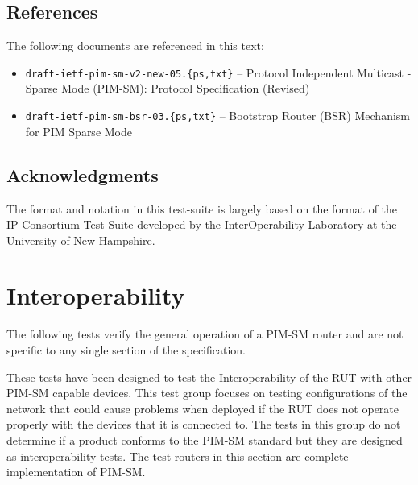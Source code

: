 \documentclass[11pt]{report}
\begin{document}
\section{References}
\label{sec:references}

The following documents are referenced in this text:

\begin{itemize}

 \item \verb=draft-ietf-pim-sm-v2-new-05.{ps,txt}= -- Protocol Independent
		  Multicast - Sparse Mode (PIM-SM): Protocol Specification
		  (Revised)

 \item \verb=draft-ietf-pim-sm-bsr-03.{ps,txt}= -- Bootstrap Router (BSR)
		  Mechanism for PIM Sparse Mode

\end{itemize}


\section{Acknowledgments}
The format and notation in this test-suite is largely based on the format of
the IP Consortium Test Suite developed by the InterOperability Laboratory at
the University of New Hampshire.

%
%
\renewcommand{\chaptername}{Test Group}
\newcommand{\para}[1]{\vspace{1ex}\noindent{\large\bf #1}}
\newcommand{\subpara}[1]{\vspace{1ex}\noindent\emph{#1}}

\chapter{Interoperability}

\para{Scope:}
The following tests verify the general operation of a PIM-SM router and are
not specific to any single section of the specification.

\para{Overview:}
These tests have been designed to test the Interoperability of the RUT with
other PIM-SM capable devices. This test group focuses on testing
configurations of the network that could cause problems when deployed if the
RUT does not operate properly with the devices that it is connected to. The
tests in this group do not determine if a product conforms to the PIM-SM
standard but they are designed as interoperability tests. The test routers in
this section are complete implementation of PIM-SM.
\end{document}
